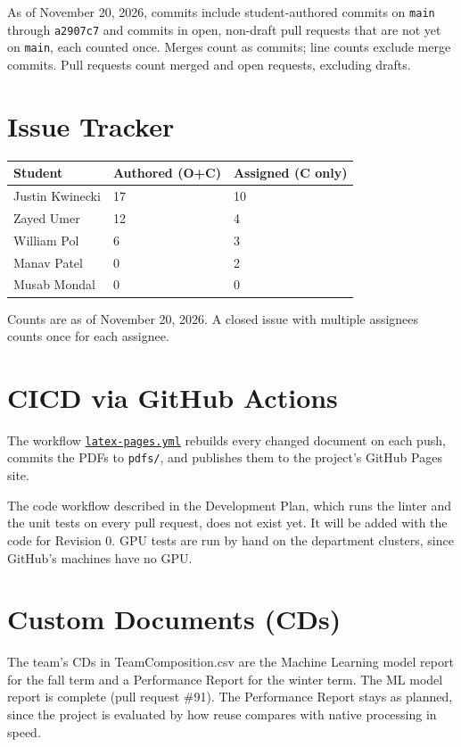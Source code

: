 \documentclass{article}
\begin{document}
As of November 20, 2026, commits include student-authored commits on
\texttt{main} through \texttt{a2907c7} and commits in open, non-draft pull
requests that are not yet on \texttt{main}, each counted once. Merges count as
commits; line counts exclude merge commits. Pull requests count merged and open
requests, excluding drafts.

\section{Issue Tracker}

\begin{table}[H]
\centering
\begin{tabular}{lll}
\toprule
\textbf{Student} & \textbf{Authored (O+C)} & \textbf{Assigned (C only)}\\
\midrule
Justin Kwinecki & 17 & 10\\
Zayed Umer & 12 & 4\\
William Pol & 6 & 3\\
Manav Patel & 0 & 2\\
Musab Mondal & 0 & 0\\
\bottomrule
\end{tabular}
\end{table}

Counts are as of November 20, 2026. A closed issue with multiple assignees
counts once for each assignee.

\section{CICD via GitHub Actions}

The workflow
\href{https://github.com/tandemkv/Tandem/blob/main/.github/workflows/latex-pages.yml}
{\texttt{latex-pages.yml}} rebuilds every changed document on each push,
commits the PDFs to \texttt{pdfs/}, and publishes them to the project's GitHub
Pages site.

The code workflow described in the Development Plan, which runs the linter and
the unit tests on every pull request, does not exist yet. It will be added with
the code for Revision 0. GPU tests are run by hand on the department clusters,
since GitHub's machines have no GPU.

\section{Custom Documents (CDs)}

The team's CDs in TeamComposition.csv are the Machine Learning model report for
the fall term and a Performance Report for the winter term. The ML model report
is complete (pull request \#91). The Performance Report stays as planned, since
the project is evaluated by how reuse compares with native processing in speed.
\end{document}
